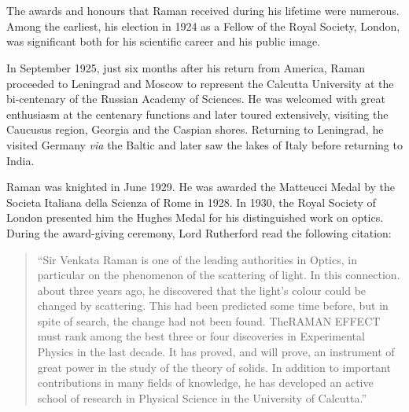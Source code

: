 \chapter{}\label{chap4}

\smallskip



\noindent
The awards and honours that Raman received during his lifetime were numerous. Among the earliest, his election in 1924 as a Fellow of the Royal Society, London, was significant both for his scientific career and his public image.

In September 1925, just six months after his return from America, Raman proceeded to Leningrad and Moscow to represent the Calcutta University at the bi-centenary of the Russian Academy of Sciences. He was welcomed with great enthusiasm at the centenary functions and later toured extensively, visiting the Caucusus region, Georgia and the Caspian shores. Returning to Leningrad, he visited Germany {\em via} the Baltic and later saw the lakes of Italy before returning to India.

Raman was knighted in June 1929. He was awarded the Matteucci Medal by the Societa Italiana della Scienza of Rome in 1928. In 1930, the Royal Society of London presented him the Hughes Medal for his distinguished work on optics. During the award-giving ceremony, Lord Rutherford read the following citation:
\begin{quote}
{\fontsize{10pt}{12pt}\selectfont
``Sir Venkata Raman is one of the leading authorities in Optics, in particular on the phenomenon of the scattering of light. In this connection. about three years ago, he discovered that the light's colour could be changed by scattering. This had been predicted some time before, but in spite of search, the change had not been found. The\break RAMAN EFFECT must rank among the best three or four discoveries in Experimental Physics in the last decade. It has proved, and will prove, an instrument of great power in the study of the theory of solids. In addition to important contributions in many fields of knowledge, he has developed an active school of research in Physical Science in the University of Calcutta.''}\relax
\end{quote}

